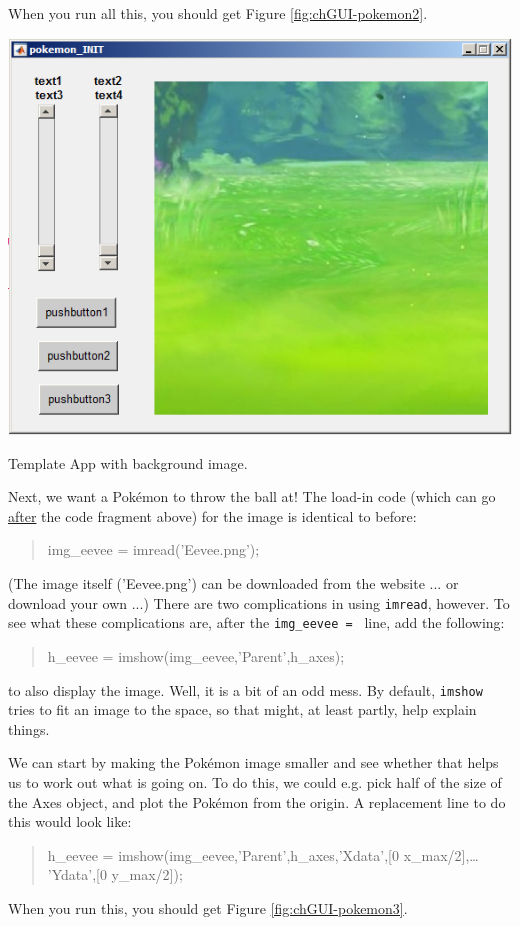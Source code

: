 \documentclass{tufte-book} %
\newenvironment{docspec}{\begin{quotation}\ttfamily\parskip0pt\parindent0pt\ignorespaces}{\end{quotation}}
\begin{document}
When you run all this, you should get Figure \ref{fig:chGUI-pokemon2}. 

\begin{marginfigure}[0.0in]
\includegraphics[width=\linewidth]{chGUI-pokemon2.png}
\caption{Template App with background image.}
\label{fig:chGUI-pokemon2}
\end{marginfigure}

Next, we want a Pok\'emon to throw the ball at! The load-in code (which can go \uline{after} the code fragment above) for the image is identical to before:
\begin{docspec}
img\_eevee = imread(\textcolor[rgb]{0.501961,0,1}{'Eevee.png'});
\end{docspec}
(The image itself ('\textsf{Eevee.png}') can be downloaded from the website ... or download your own ...) There are two complications in using \texttt{imread}, however. To see what these complications are, after the \texttt{img\_eevee = } line, add the following:
\begin{docspec}
h\_eevee = imshow(img\_eevee,\textcolor[rgb]{0.501961,0,1}{'Parent'},h\_axes);
\end{docspec}
to also display the image. Well, it is a bit of an odd mess. By default, \texttt{imshow} tries to fit an image to the space, so that might, at least partly, help explain things.

We can start by making the Pok\'emon image smaller and see whether that helps us to work out what is going on. To do this, we could e.g. pick half of the size of the \textsf{Axes} object, and plot the Pok\'emon from the origin. A replacement line to do this would look like: 
\begin{docspec}
h\_eevee = imshow(img\_eevee,\textcolor[rgb]{0.501961,0,1}{'Parent'},h\_axes,\textcolor[rgb]{0.501961,0,1}{'Xdata'},[0 x\_max/2],\ldots
\\\textcolor[rgb]{0.501961,0,1}{'Ydata'},[0 y\_max/2]);
\end{docspec}
When you run this, you should get Figure \ref{fig:chGUI-pokemon3}. 
\end{document}
